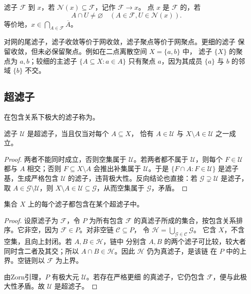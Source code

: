 \begin{definition}[滤子的收敛与聚点]
滤子 \(\mathcal F\) 到 \(x\)，若
\(\mathcal N(x)\subseteq\mathcal F\)，记作 \(\mathcal F\to x\)。
点 \(x\) 是 \(\mathcal F\) 的，若
\[
 A\cap U\ne\varnothing
 \quad(A\in\mathcal F, U\in\mathcal N(x)).
\]
等价地，\(x\in\bigcap_{A\in\mathcal F}\overline A\)。
\end{definition}

对网的尾滤子，滤子收敛等价于网收敛，滤子聚点等价于网聚点。更细的滤子
保留收敛，但未必保留聚点。例如在二点离散空间 \(X=\{a,b\}\) 中，
滤子 \(\{X\}\) 的聚点为 \(a,b\)；较细的主滤子
\(\{A\subseteq X:a\in A\}\) 只有聚点 \(a\)，因为其成员 \(\{a\}\)
与 \(b\) 的邻域 \(\{b\}\) 不交。

\subsection{超滤子}

\begin{definition}[超滤子]
在包含关系下极大的滤子称为。
\end{definition}

\begin{proposition}[超滤子的二分性质]
\label{prop:ultrafilter-dichotomy}
滤子 \(\mathcal U\) 是超滤子，当且仅当对每个 \(A\subseteq X\)，
恰有 \(A\in\mathcal U\) 与 \(X\setminus A\in\mathcal U\) 之一成立。
\end{proposition}

\begin{proof}
两者不能同时成立，否则空集属于 \(\mathcal U\)。若两者都不属于
\(\mathcal U\)，则每个 \(F\in\mathcal U\) 都与 \(A\) 相交；否则
\(F\subseteq X\setminus A\) 会推出补集属于 \(\mathcal U\)。于是
\(\{F\cap A:F\in\mathcal U\}\) 是滤子基，生成严格包含
\(\mathcal U\) 的滤子，违背极大性。反向结论也直接：若
\(\mathcal G\supsetneq\mathcal U\) 是滤子，取
\(A\in\mathcal G\setminus\mathcal U\)，则 \(X\setminus A\in\mathcal U
\subseteq\mathcal G\)，从而空集属于 \(\mathcal G\)，矛盾。
\end{proof}

\begin{theorem}[超滤子扩张原理]
\label{thm:ultrafilter-extension}
集合 \(X\) 上的每个滤子都包含在某个超滤子中。
\end{theorem}

\begin{proof}
设原滤子为 \(\mathcal F\)，令 \(P\) 为所有包含
\(\mathcal F\) 的真滤子所成的集合，按包含关系排序。它非空，因为
\(\mathcal F\in P\)。对非空链 \(\mathcal C\subseteq P\)，
令 \(\mathcal H=\bigcup_{\mathcal G\in\mathcal C}\mathcal G\)。
它含 \(X\)，不含空集，且向上封闭。若 \(A,B\in\mathcal H\)，链中
分别含 \(A,B\) 的两个滤子可比较，较大者同时含二者及其交；所以
\(A\cap B\in\mathcal H\)。因此 \(\mathcal H\) 仍为真滤子，是该链
在 \(P\) 中的上界。空链则以 \(\mathcal F\) 为上界。

由Zorn引理，\(P\) 有极大元 \(\mathcal U\)。若存在严格更细
的真滤子，它仍包含 \(\mathcal F\)，便与此极大性矛盾。故 \(\mathcal U\)
是超滤子。
\end{proof}

